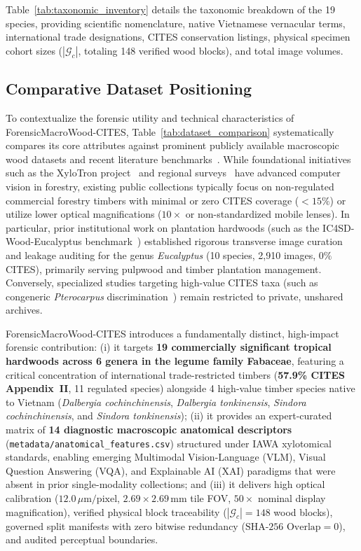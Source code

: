 \documentclass[a4paper,fleqn,12pt]{cas-sc}
\begin{document}
Table~\ref{tab:taxonomic_inventory} details the taxonomic breakdown of the 19 species, providing scientific nomenclature, native Vietnamese vernacular terms, international trade designations, CITES conservation listings, physical specimen cohort sizes ($|\mathcal{G}_c|$, totaling 148 verified wood blocks), and total image volumes.

\subsection{Comparative Dataset Positioning}
\label{sec:comparative_positioning}

To contextualize the forensic utility and technical characteristics of ForensicMacroWood-CITES, Table~\ref{tab:dataset_comparison} systematically compares its core attributes against prominent publicly available macroscopic wood datasets and recent literature benchmarks~\cite{ravindran2020,ravindran2021,figueroamata2022,song2025,liu2025,nguyentrong2026eucalyptus}. While foundational initiatives such as the XyloTron project~\cite{ravindran2020,ravindran2021} and regional surveys~\cite{figueroamata2022,song2025} have advanced computer vision in forestry, existing public collections typically focus on non-regulated commercial forestry timbers with minimal or zero CITES coverage ($<15\%$) or utilize lower optical magnifications ($10\times$ or non-standardized mobile lenses). In particular, prior institutional work on plantation hardwoods (such as the IC4SD-Wood-Eucalyptus benchmark~\cite{nguyentrong2026eucalyptus}) established rigorous transverse image curation and leakage auditing for the genus \textit{Eucalyptus} (10 species, 2,910 images, $0\%$ CITES), primarily serving pulpwood and timber plantation management. Conversely, specialized studies targeting high-value CITES taxa (such as congeneric \textit{Pterocarpus} discrimination~\cite{liu2025}) remain restricted to private, unshared archives.

ForensicMacroWood-CITES introduces a fundamentally distinct, high-impact forensic contribution: (i) it targets \textbf{19 commercially significant tropical hardwoods across 6 genera in the legume family Fabaceae}, featuring a critical concentration of international trade-restricted timbers (\textbf{57.9\% CITES Appendix~II}, 11 regulated species) alongside 4 high-value timber species native to Vietnam (\textit{Dalbergia cochinchinensis}, \textit{Dalbergia tonkinensis}, \textit{Sindora cochinchinensis}, and \textit{Sindora tonkinensis}); (ii) it provides an expert-curated matrix of \textbf{14 diagnostic macroscopic anatomical descriptors} (\texttt{metadata/anatomical\_features.csv}) structured under IAWA xylotomical standards, enabling emerging Multimodal Vision-Language (VLM), Visual Question Answering (VQA), and Explainable AI (XAI) paradigms that were absent in prior single-modality collections; and (iii) it delivers high optical calibration ($12.0\,\mu\text{m/pixel}$, $2.69 \times 2.69\,\text{mm}$ tile FOV, $50\times$ nominal display magnification), verified physical block traceability ($|\mathcal{G}_c| = 148$ wood blocks), governed split manifests with zero bitwise redundancy ($\text{SHA-256 Overlap} = 0$), and audited perceptual boundaries.
\end{document}
